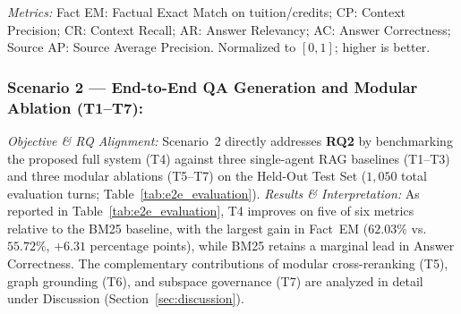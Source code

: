 \begin{table}[!htbp]
\centering
\caption{Scenario 2: End-to-end QA generation and modular ablation on Held-Out Test Set ($N=50, R=3$, 1,050 total evaluation turns, Top-7 context).}
\label{tab:e2e_evaluation}
\smallskip
\parbox{\columnwidth}{\footnotesize\emph{Metrics:} Fact EM: Factual Exact Match on tuition/credits; CP: Context Precision; CR: Context Recall; AR: Answer Relevancy; AC: Answer Correctness; Source AP: Source Average Precision. Normalized to $[0,1]$; higher is better.}
\end{table}

\subsubsection{Scenario 2 --- End-to-End QA Generation and Modular Ablation (T1--T7):}
\emph{Objective \& RQ Alignment:} Scenario~2 directly addresses \textbf{RQ2} by benchmarking the proposed full system (T4) against three single-agent RAG baselines (T1--T3) and three modular ablations (T5--T7) on the Held-Out Test Set ($1,050$ total evaluation turns; Table~\ref{tab:e2e_evaluation}).
\emph{Results \& Interpretation:} As reported in Table~\ref{tab:e2e_evaluation}, T4 improves on five of six metrics relative to the BM25 baseline, with the largest gain in Fact~EM ($62.03\%$ vs.\ $55.72\%$, $+6.31$ percentage points), while BM25 retains a marginal lead in Answer Correctness. The complementary contributions of modular cross-reranking (T5), graph grounding (T6), and subspace governance (T7) are analyzed in detail under Discussion (Section~\ref{sec:discussion}).

